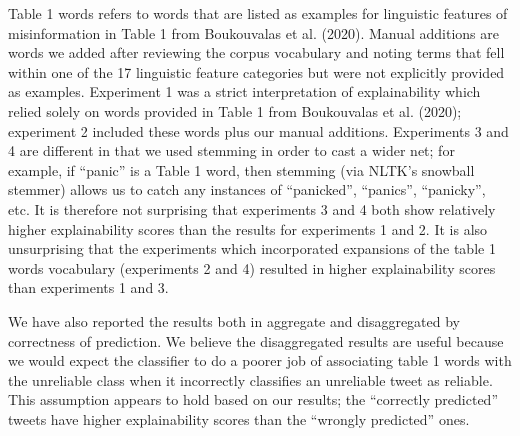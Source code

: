 \documentclass{article}
\begin{document}
Table 1 words refers to words that are listed as examples for linguistic
features of misinformation in Table 1 from Boukouvalas et al. (2020).
Manual additions are words we added after reviewing the corpus
vocabulary and noting terms that fell within one of the 17 linguistic
feature categories but were not explicitly provided as examples.
Experiment 1 was a strict interpretation of explainability which relied
solely on words provided in Table 1 from Boukouvalas et al. (2020);
experiment 2 included these words plus our manual additions. Experiments
3 and 4 are different in that we used stemming in order to cast a wider
net; for example, if ``panic'' is a Table 1 word, then stemming (via
NLTK's snowball stemmer) allows us to catch any instances of
``panicked'', ``panics'', ``panicky'', etc. It is therefore not
surprising that experiments 3 and 4 both show relatively higher
explainability scores than the results for experiments 1 and 2. It is
also unsurprising that the experiments which incorporated expansions of
the table 1 words vocabulary (experiments 2 and 4) resulted in higher
explainability scores than experiments 1 and 3.

We have also reported the results both in aggregate and disaggregated by
correctness of prediction. We believe the disaggregated results are
useful because we would expect the classifier to do a poorer job of
associating table 1 words with the unreliable class when it incorrectly
classifies an unreliable tweet as reliable. This assumption appears to
hold based on our results; the ``correctly predicted'' tweets have
higher explainability scores than the ``wrongly predicted'' ones.
\end{document}
